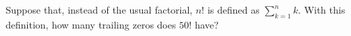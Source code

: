 Suppose that, instead of the usual factorial, $n!$ is defined as $\displaystyle\sum_{k=1}^{n}k$. With this definition, how many trailing zeros does $50!$ have?
